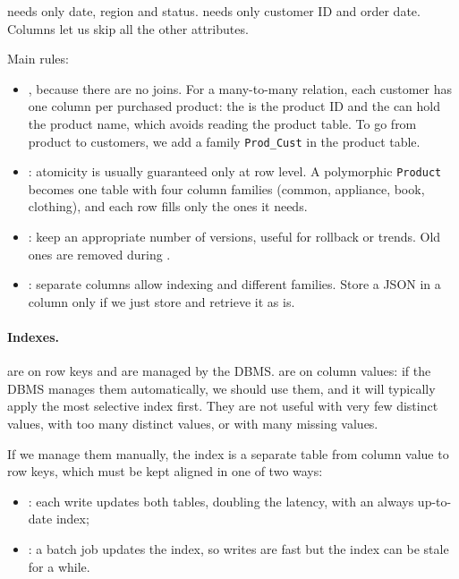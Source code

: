 \begin{example}
 needs only date, region and status.  needs only customer ID and order date. Columns let us skip all the other attributes.
\end{example}

Main rules:
\begin{itemize}
  \item {}, because there are no joins. For a many-to-many relation, each customer has one column per purchased product: the  is the product ID and the  can hold the product name, which avoids reading the product table. To go from product to customers, we add a family \texttt{Prod\_Cust} in the product table.
  \item {}: atomicity is usually guaranteed only at row level. A polymorphic \texttt{Product} becomes one table with four column families (common, appliance, book, clothing), and each row fills only the ones it needs.
  \item {}: keep an appropriate number of versions, useful for rollback or trends. Old ones are removed during .
  \item {}: separate columns allow indexing and different families. Store a JSON in a column only if we just store and retrieve it as is.
\end{itemize}

\paragraph{Indexes.}  are on row keys and are managed by the DBMS.  are on column values: if the DBMS manages them automatically, we should use them, and it will typically apply the most selective index first. They are not useful with very few distinct values, with too many distinct values, or with many missing values.

If we manage them manually, the index is a separate table from column value to row keys, which must be kept aligned in one of two ways:
\begin{itemize}
  \item {}: each write updates both tables, doubling the latency, with an always up-to-date index;
  \item {}: a batch job updates the index, so writes are fast but the index can be stale for a while.
\end{itemize}

